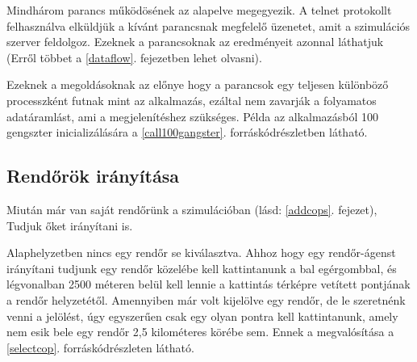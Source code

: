 \documentclass[a4paper,12pt]{report}
\begin{document}






Mindhárom parancs működösének az alapelve megegyezik. A telnet protokollt felhasználva elküldjük a kívánt parancsnak megfelelő üzenetet, amit a szimulációs szerver feldolgoz. Ezeknek a parancsoknak az eredményeit azonnal láthatjuk (Erről többet a \ref{dataflow}. fejezetben lehet olvasni).

\vspace{2mm}
Ezeknek a megoldásoknak az előnye hogy a parancsok egy teljesen különböző processzként futnak mint az alkalmazás, ezáltal nem zavarják a folyamatos adatáramlást, ami a megjelenítéshez szükséges. Példa az alkalmazásból 100 gengszter inicializálására a \ref{call100gangster}. forráskódrészletben látható.



\subsection{Rendőrök irányítása}
\label{controlcops}

Miután már van saját rendőrünk a szimulációban (lásd: \ref{addcops}. fejezet), Tudjuk őket irányítani is.

\vspace{2mm}
Alaphelyzetben nincs egy rendőr se kiválasztva. Ahhoz hogy egy rendőr-ágenst irányítani tudjunk egy rendőr közelébe kell kattintanunk a bal egérgombbal, és légvonalban 2500 méteren belül kell lennie a kattintás térképre vetített pontjának a rendőr helyzetétől. Amennyiben már volt kijelölve egy rendőr, de le szeretnénk venni a jelölést, úgy egyszerűen csak egy olyan pontra kell kattintanunk, amely nem esik bele egy rendőr 2,5 kilométeres körébe sem. Ennek a megvalósítása a \ref{selectcop}. forráskódrészleten látható.


\end{document}

